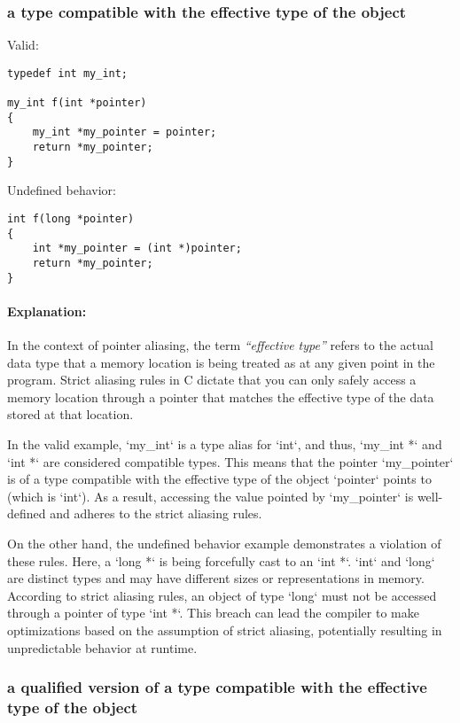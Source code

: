 \documentclass[12pt]{article}
\begin{document}
\subsubsection{a type compatible with the effective type of the object}

Valid:

\begin{lstlisting}
typedef int my_int;

my_int f(int *pointer)
{
    my_int *my_pointer = pointer;
    return *my_pointer;
}
\end{lstlisting}

Undefined behavior:

\begin{lstlisting}
int f(long *pointer)
{
    int *my_pointer = (int *)pointer;
    return *my_pointer;
}
\end{lstlisting}

\paragraph{Explanation:}
In the context of pointer aliasing, the term \textit{``effective type''} refers to the actual data type that a memory location is being treated as at any given point in the program. Strict aliasing rules in C dictate that you can only safely access a memory location through a pointer that matches the effective type of the data stored at that location.

In the valid example, `my\_int` is a type alias for `int`, and thus, `my\_int *` and `int *` are considered compatible types. This means that the pointer `my\_pointer` is of a type compatible with the effective type of the object `pointer` points to (which is `int`). As a result, accessing the value pointed by `my\_pointer` is well-defined and adheres to the strict aliasing rules.

On the other hand, the undefined behavior example demonstrates a violation of these rules. Here, a `long *` is being forcefully cast to an `int *`. `int` and `long` are distinct types and may have different sizes or representations in memory. According to strict aliasing rules, an object of type `long` must not be accessed through a pointer of type `int *`. This breach can lead the compiler to make optimizations based on the assumption of strict aliasing, potentially resulting in unpredictable behavior at runtime.

\subsubsection{a qualified version of a type compatible with the effective type of the object}
\end{document}
